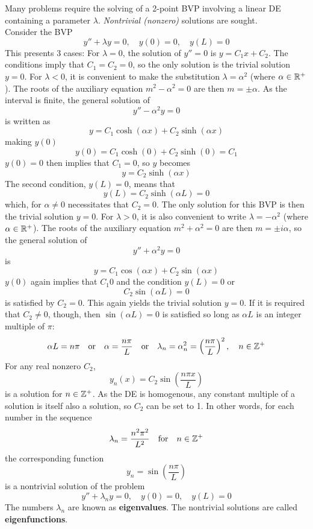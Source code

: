 \documentclass[./Differential Equations.tex]{subfiles}
\begin{document}
			Many problems require the solving of a 2-point BVP involving a linear DE containing a parameter \(\lambda\). \textit{Nontrivial (nonzero)} solutions are sought. \\
			Consider the BVP
				\[
					y'' + \lambda y = 0, \quad
					y(0) = 0, \quad
					y(L) = 0
				\]
			This presents 3 cases:
				For \(\lambda = 0\), the solution of \(y'' = 0\) is \(y = C_1x + C_2\). The conditions imply that \(C_1 = C_2 = 0\), so the only solution is the trivial solution \(y = 0\).
				For \(\lambda < 0\), it is convenient to make the substitution \(\lambda = \alpha^2\) (where \(\alpha \in \mathbb{R}^+\)). The roots of the auxiliary equation \(m^2 - \alpha^2 = 0\) are then \(m = \pm \alpha\). As the interval is finite, the general solution of
					\[y'' - \alpha^2y = 0\]
					is written as
					\[y = C_1\cosh(\alpha x) + C_2\sinh(\alpha x)\]
					making \(y(0)\)
					\[y(0) = C_1\cosh(0) + C_2\sinh(0) = C_1\]
					\(y(0) = 0\) then implies that \(C_1 = 0\), so \(y\) becomes
					\[y = C_2\sinh(\alpha x)\]
					The second condition, \(y(L) = 0\), means that
					\[y(L) = C_2\sinh(\alpha L) = 0\]
					which, for \(\alpha \ne 0\) necessitates that \(C_2 = 0\). The only solution for this BVP is then the trivial solution \(y = 0\).
				For \(\lambda > 0\), it is also convenient to write \(\lambda = -\alpha^2\) (where \(\alpha \in \mathbb{R}^+\)). The roots of the auxiliary equation \(m^2 + \alpha^2 = 0\) are then \(m = \pm i\alpha\), so the general solution of
					\[y'' + \alpha^2y = 0\]
					is
					\[y = C_1\cos(\alpha x) + C_2\sin(\alpha x)\]
					\(y(0)\) again implies that \(C_1  0\) and the condition \(y(L) = 0\) or
					\[C_2\sin(\alpha L) = 0\]
					is satisfied by \(C_2 = 0\). This again yields the trivial solution \(y = 0\). If it is required that \(C_2 \ne 0\), though, then \(\sin(\alpha L) = 0\) is satisfied so long as \(\alpha L\) is an integer multiple of \(\pi\):
					\[
						\alpha L = n\pi \quad \text{or} \quad
						\alpha = \frac{n\pi}{L} \quad \text{or} \quad
						\lambda_n = \alpha_n^2 = \left(\frac{n\pi}{L}\right)^2, \quad
						n \in \mathbb{Z}^+
					\]
					For any real nonzero \(C_2\),
					\[y_n(x) = C_2\sin\left(\frac{n\pi x}{L}\right)\]
					is a solution for \(n \in \mathbb{Z}^+\). As the DE is homogenous, any constant multiple of a solution is itself also a solution, so \(C_2\) can be set to 1. In other words, for each number in the sequence
					\[\lambda_n = \frac{n^2\pi^2}{L^2} \quad \text{for} \quad n \in \mathbb{Z}^+\]
					the corresponding function
					\[y_n = \sin\left(\frac{n\pi}{L}\right)\]
					is a nontrivial solution of the problem
					\[
						y'' + \lambda_ny = 0, \quad
						y(0) = 0, \quad
						y(L) = 0
					\]
					The numbers \(\lambda_n\) are known as \textbf{eigenvalues}. The nontrivial solutions are called \textbf{eigenfunctions}.
\end{document}
